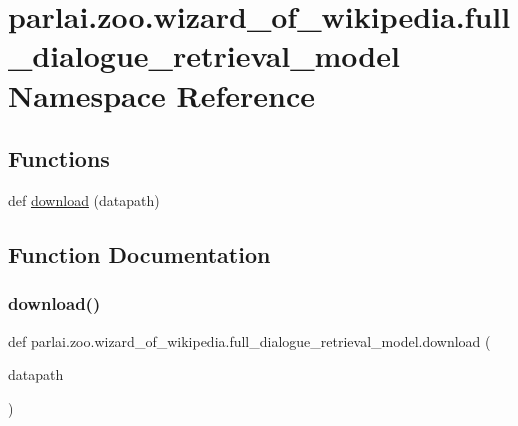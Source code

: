 \hypertarget{namespaceparlai_1_1zoo_1_1wizard__of__wikipedia_1_1full__dialogue__retrieval__model}{}\section{parlai.\+zoo.\+wizard\+\_\+of\+\_\+wikipedia.\+full\+\_\+dialogue\+\_\+retrieval\+\_\+model Namespace Reference}
\label{namespaceparlai_1_1zoo_1_1wizard__of__wikipedia_1_1full__dialogue__retrieval__model}
\subsection*{Functions}
\begin{DoxyCompactItemize}
\item 
def \hyperlink{namespaceparlai_1_1zoo_1_1wizard__of__wikipedia_1_1full__dialogue__retrieval__model_ac0657f65992bc0ee1be1b6f673ae50e6}{download} (datapath)
\end{DoxyCompactItemize}


\subsection{Function Documentation}
\mbox{\label{namespaceparlai_1_1zoo_1_1wizard__of__wikipedia_1_1full__dialogue__retrieval__model_ac0657f65992bc0ee1be1b6f673ae50e6}} 
\subsubsection{\texorpdfstring{download()}{download()}}
{\footnotesize\ttfamily def parlai.\+zoo.\+wizard\+\_\+of\+\_\+wikipedia.\+full\+\_\+dialogue\+\_\+retrieval\+\_\+model.\+download (\begin{DoxyParamCaption}\item[{}]{datapath }\end{DoxyParamCaption})}



